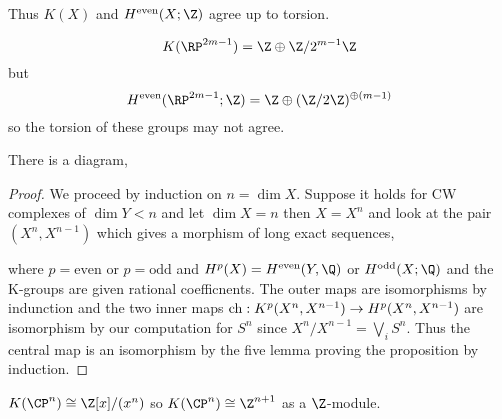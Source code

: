 \documentclass[12pt]{extarticle}
\begin{document}
\begin{rmk}
Thus $K(X)$ and $H^{\text{even}}(X; \Z)$ agree up to torsion. 
\end{rmk}

\begin{example}
\[ K(\RP^{2m - 1}) = \Z \oplus \Z / 2^{m-1} \Z \] but 
\[ H^{\text{even}}(\RP^{2m - 1}; \Z) = \Z \oplus (\Z / 2 \Z)^{\oplus (m - 1)} \]
so the torsion of these groups may not agree.
\end{example}

\begin{theorem}
There is a diagram,
\begin{center}
\end{center}
\end{theorem}

\begin{proof}
We proceed by induction on $n = \dim{X}$. Suppose it holds for CW complexes of $\dim{Y} < n$ and let $\dim{X} = n$ then $X = X^n$ and look at the pair $(X^n, X^{n-1})$ which gives a morphism of long exact sequences,
\begin{center}
\end{center}
where $p = \text{even}$ or $p = \text{odd}$ and $H^p(X) = H^{\text{even}}(Y, \Q)$ or $H^{\text{odd}}(X; \Q)$ and the K-groups are given rational coefficnents. The outer maps are isomorphisms by indunction and the two inner maps $\mathrm{ch} : K^p(X^n, X^{n-1}) \to H^p(X^n, X^{n-1})$ are isomorphism by our computation for $S^n$ since $X^n / X^{n-1} = \bigvee_i S^n$. Thus the central map is an isomorphism by the five lemma proving the proposition by induction.
\end{proof}

\begin{example}
$K(\CP^n) \cong \Z[x]/(x^n)$ so $K(\CP^n) \cong \Z^{n+1}$ as a $\Z$-module. 
\end{example}
\end{document}
